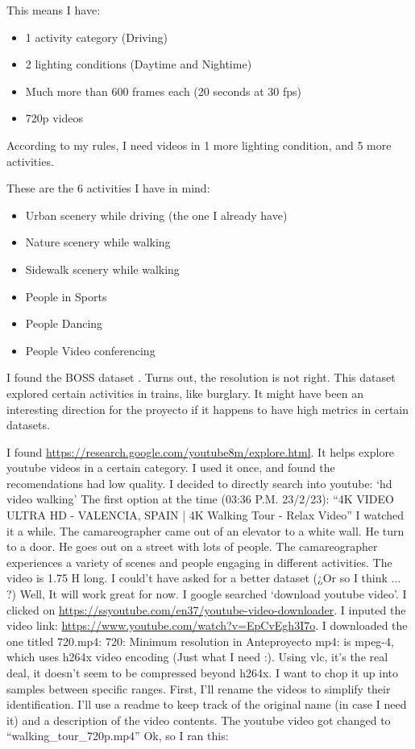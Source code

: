 \documentclass[12pt,oneside]{book}
\begin{document}
  This means I have:
  \begin{itemize}
    \item 1 activity category (Driving)
    \item 2 lighting conditions (Daytime and Nightime)
    \item Much more than 600 frames each (20 seconds at 30 fps)
    \item 720p videos
  \end{itemize}
  
  According to my rules, I need videos in 1 more lighting condition, and 5 more activities.

  These are the 6 activities I have in mind:
  \begin{itemize}
    \item Urban scenery while driving (the one I already have)
    \item Nature scenery while walking
    \item Sidewalk scenery while walking
    \item People in Sports
    \item People Dancing
    \item People Video conferencing
  \end{itemize}

  I found the BOSS dataset \cite{Velastin2017}. Turns out, the resolution is not
  right. This dataset explored certain activities in trains, like burglary. It might have been an interesting direction for the proyecto if it happens to have high metrics in certain datasets.

  I found \url{https://research.google.com/youtube8m/explore.html}.
  It helps explore youtube videos in a certain category.
  I used it once, and found the recomendations had low quality.
  I decided to directly search into youtube: `hd video walking'
  The first option at the time (03:36 P.M. 23/2/23): ``4K VIDEO ULTRA HD - VALENCIA, SPAIN | 4K Walking Tour - Relax Video''
  I watched it a while.
  The camareographer came out of an elevator to a white wall.
  He turn to a door.
  He goes out on a street with lots of people.
  The camareographer experiences a variety of scenes and people engaging in different activities.
  The video is 1.75 H long.
  I could't have asked for a better dataset (¿Or so I think ... ?)
  Well, It will work great for now.
  I google searched `download youtube video'.
  I clicked on \url{https://ssyoutube.com/en37/youtube-video-downloader}.
  I inputed the video link: \url{https://www.youtube.com/watch?v=EpCvEgh3I7o}.
  I downloaded the one titled 720.mp4:
    720: Minimum resolution in Anteproyecto
    mp4: is mpeg-4, which uses h264x video encoding (Just what I need :).
  Using vlc, it's the real deal, it doesn't seem to be compressed beyond h264x.
  I want to chop it up into samples between specific ranges.
  First, I'll rename the videos to simplify their identification.
  I'll use a readme to keep track of the original name (in case I need it) and a
  description of the video contents.
  The youtube video got changed to ``walking\_tour\_720p.mp4''
  Ok, so I ran this:
\end{document}
